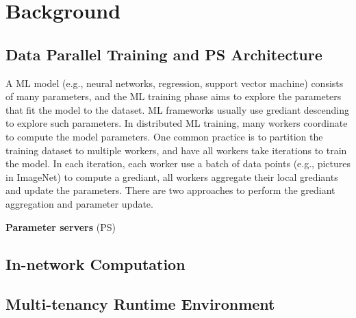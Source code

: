 \section{Background}
\subsection{Data Parallel Training and PS Architecture}
A ML model (e.g., neural networks, regression, support vector machine) 
consists of many parameters, and the ML training phase aims to explore the 
parameters that fit the model to the dataset. ML frameworks usually use 
grediant descending to explore such parameters.
In distributed ML training, many workers coordinate to compute the model parameters. 
One common practice is to partition the training dataset to multiple workers,
and have all workers take iterations to train the model.
In each iteration, each worker use a batch of data points (e.g., pictures in ImageNet)
to compute a grediant, all workers aggregate their local grediants and update the parameters.
There are two approaches to perform the grediant aggregation and parameter update.

\textbf{Parameter servers} (PS) 



\subsection{In-network Computation}
\subsection{Multi-tenancy Runtime Environment}
